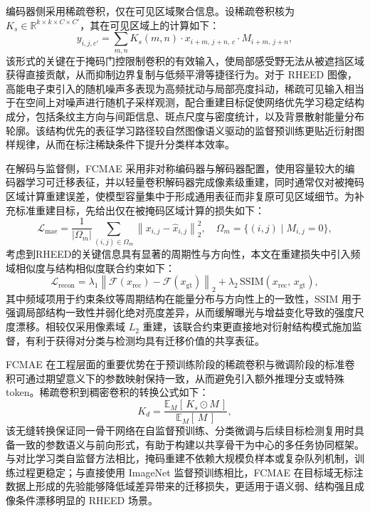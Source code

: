 编码器侧采用稀疏卷积，仅在可见区域聚合信息。设稀疏卷积核为 $K_s \in \mathbb{R}^{k \times k \times C \times C'}$，其在可见区域上的计算如下：
\begin{equation}
    y_{i,j,c'} = \sum_{m,n} K_s(m,n) \cdot x_{i+m,\,j+n,\,c} \cdot M_{i+m,\,j+n},
\end{equation}
该形式的关键在于掩码门控限制卷积的有效输入，使局部感受野无法从被遮挡区域获得直接贡献，从而抑制边界复制与低频平滑等捷径行为。对于 RHEED 图像，高能电子束引入的随机噪声多表现为高频扰动与局部亮度抖动，稀疏可见输入相当于在空间上对噪声进行随机子采样观测，配合重建目标促使网络优先学习稳定结构成分，包括条纹主方向与间距信息、斑点尺度与密度统计，以及背景散射能量分布轮廓。该结构优先的表征学习路径较自然图像语义驱动的监督预训练更贴近衍射图样规律，从而在标注稀缺条件下提升分类样本效率。

在解码与监督侧，FCMAE 采用非对称编码器与解码器配置，使用容量较大的编码器学习可迁移表征，并以轻量卷积解码器完成像素级重建，同时通常仅对被掩码区域计算重建误差，使模型容量集中于形成通用表征而非复原可见区域细节。为补充标准重建目标，先给出仅在被掩码区域计算的损失如下：
\begin{equation}
    \mathcal{L}_{\mathrm{mae}}=\frac{1}{|\Omega_m|}\sum_{(i,j)\in\Omega_m}\left\|x_{i,j}-\hat{x}_{i,j}\right\|_2^2,\quad
    \Omega_m=\{(i,j)\mid M_{i,j}=0\},
\end{equation}
考虑到RHEED的关键信息具有显著的周期性与方向性，本文在重建损失中引入频域相似度与结构相似度联合约束如下：
\begin{equation}
    \mathcal{L}_{\mathrm{recon}}
    = \lambda_1 \left\lVert \mathcal{F}(x_{\mathrm{rec}}) - \mathcal{F}(x_{\mathrm{gt}}) \right\rVert_2
    + \lambda_2\, \mathrm{SSIM}(x_{\mathrm{rec}},\,x_{\mathrm{gt}}),
\end{equation}
其中频域项用于约束条纹等周期结构在能量分布与方向性上的一致性，SSIM 用于强调局部结构一致性并弱化绝对亮度差异，从而缓解曝光与增益变化导致的强度尺度漂移。相较仅采用像素域 $L_2$ 重建，该联合约束更直接地对衍射结构模式施加监督，有利于获得对分类与检测均具有迁移价值的共享表征。

FCMAE 在工程层面的重要优势在于预训练阶段的稀疏卷积与微调阶段的标准卷积可通过期望意义下的参数映射保持一致，从而避免引入额外推理分支或特殊 token。稀疏卷积到稠密卷积的转换公式如下：
\begin{equation}
    K_d = \dfrac{\mathbb{E}_M\!\left[\,K_s \odot M\,\right]}{\mathbb{E}_M\!\left[\,M\,\right]},
\end{equation}
该无缝转换保证同一骨干网络在自监督预训练、分类微调与后续目标检测复用时具备一致的参数语义与前向形式，有助于构建以共享骨干为中心的多任务协同框架。与对比学习类自监督方法相比，掩码重建不依赖大规模负样本或复杂队列机制，训练过程更稳定；与直接使用 ImageNet 监督预训练相比，FCMAE 在目标域无标注数据上形成的先验能够降低域差异带来的迁移损失，更适用于语义弱、结构强且成像条件漂移明显的 RHEED 场景。

